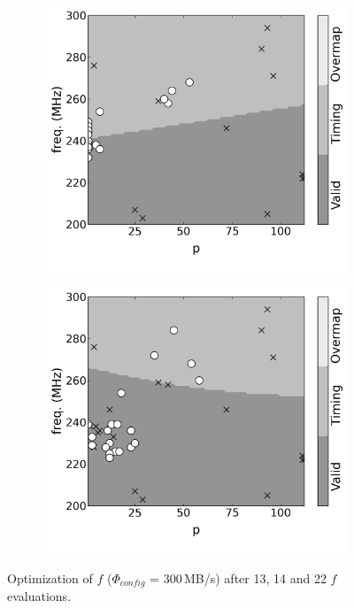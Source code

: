 \documentclass[runningheads,a4paper]{llncs}
\begin{document}
\begin{figure}
\begin{subfigure}{0.31\textwidth}
                \includegraphics[width=\textwidth]{./figs/svm009_14.png}
        \end{subfigure}
        \begin{subfigure}{0.31\textwidth}
                \centering
                \includegraphics[width=\textwidth]{./figs/svm011_22.png}
        \end{subfigure}
        \caption{Optimization of $f$ ($\Phi_{config}$ = 300\,MB/s) after 13, 14 and 22 $f$ evaluations.}\label{fig:ansonsur}
\end{figure}
\end{document}
